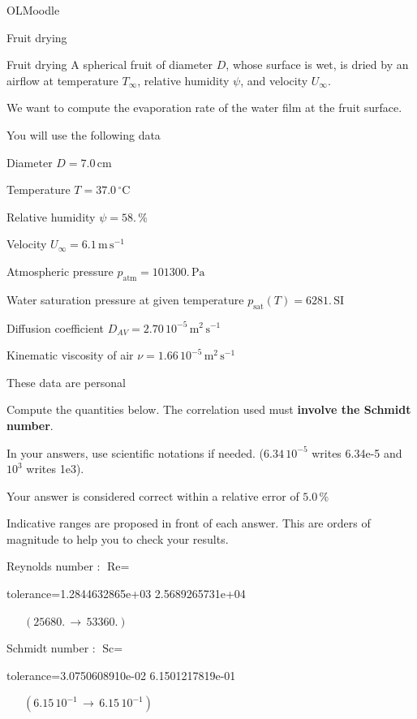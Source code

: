 \documentclass[12pt]{article}
\begin{document}
\begin{quiz}{OLMoodle}
\begin{cloze}{Fruit drying}
\end{cloze} 


 \begin{cloze}{Fruit drying} 
A spherical fruit of diameter $D$, whose surface is wet, is dried by an airflow at temperature $T_\infty$, relative humidity $\psi$, and velocity $U_\infty$.

We want to compute the evaporation rate of the water film at the fruit surface.

 

You will use the following data

 

Diameter $D = 7.0\,  \mathrm{cm} $

Temperature $T = 37.0\,  \mathrm{^\circ\mathrm{C}} $

Relative humidity $\psi = 58.\, \% $

Velocity $U_\infty = 6.1\,  \mathrm{m}\,  \mathrm{s}^{-1} $

Atmospheric pressure $p_{\text{atm}} = 101300.\,  \mathrm{Pa} $

Water saturation pressure at given temperature $p_{\text{sat}}(T) = 6281.\,  \mathrm{SI} $

Diffusion coefficient $D_{AV} =  2.70 \, 10^{-5} \,  \mathrm{m}^{2}\,  \mathrm{s}^{-1} $

Kinematic viscosity of air $\nu =  1.66 \, 10^{-5} \,  \mathrm{m}^{2}\,  \mathrm{s}^{-1} $

These data are personal

 

Compute the quantities below. The correlation used must \textbf{involve the Schmidt number}.

In your answers, use scientific notations if needed.  ($6.34\, 10^{-5}$ writes 6.34e-5 and $10^{3}$ writes 1e3).

Your answer is considered correct within a relative error of $5.0\, \% $

Indicative ranges are proposed in front of each answer. This are orders of magnitude to help you to check your results.

 

Reynolds number : $\text{Re} =  $
\begin{numerical}[points=1] 
\item[tolerance={1.2844632865e+03}] 2.5689265731e+04 
\end{numerical} 
 $\,$ 
 $ \quad (25680. \, \rightarrow \, 53360.) $ 

Schmidt number : $\text{Sc} =  $
\begin{numerical}[points=1] 
\item[tolerance={3.0750608910e-02}] 6.1501217819e-01 
\end{numerical} 
 $\,$ 
 $ \quad ( 6.15 \, 10^{-1}  \, \rightarrow \,  6.15 \, 10^{-1} ) $ 


\end{cloze}
\end{quiz}
\end{document}
